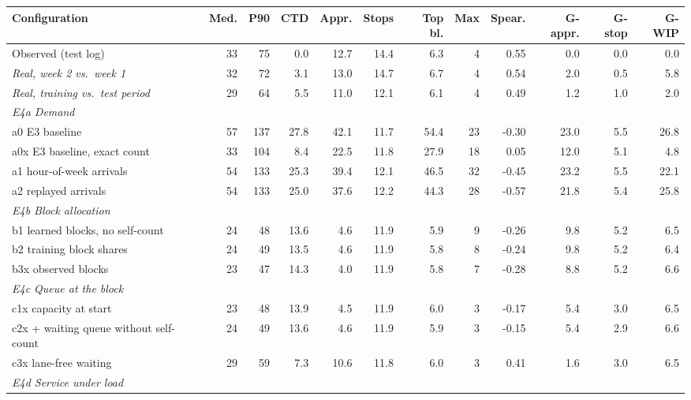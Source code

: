 \begin{table}[htbp]
\centering
\scriptsize
\setlength{\tabcolsep}{2.4pt}
\begin{tabular}{lrrrrrrrrrrr}
\toprule
\textbf{Configuration} & \textbf{Med.} & \textbf{P90} & \textbf{CTD} & \textbf{Appr.} & \textbf{Stops} & \textbf{Top bl.} & \textbf{Max} & \textbf{Spear.} & \textbf{G-appr.} & \textbf{G-stop} & \textbf{G-WIP} \\
\midrule
Observed (test log) & 33 & 75 & 0.0 & 12.7 & 14.4 & 6.3 & 4 & 0.55 & 0.0 & 0.0 & 0.0 \\
\textit{Real, week 2 vs.\ week 1} & 32 & 72 & 3.1 & 13.0 & 14.7 & 6.7 & 4 & 0.54 & 2.0 & 0.5 & 5.8 \\
\textit{Real, training vs.\ test period} & 29 & 64 & 5.5 & 11.0 & 12.1 & 6.1 & 4 & 0.49 & 1.2 & 1.0 & 2.0 \\
\midrule
\multicolumn{12}{l}{\textit{E4a Demand}} \\
a0 E3 baseline & 57 & 137 & 27.8 & 42.1 & 11.7 & 54.4 & 23 & -0.30 & 23.0 & 5.5 & 26.8 \\
a0x E3 baseline, exact count & 33 & 104 & 8.4 & 22.5 & 11.8 & 27.9 & 18 & 0.05 & 12.0 & 5.1 & 4.8 \\
a1 hour-of-week arrivals & 54 & 133 & 25.3 & 39.4 & 12.1 & 46.5 & 32 & -0.45 & 23.2 & 5.5 & 22.1 \\
a2 replayed arrivals & 54 & 133 & 25.0 & 37.6 & 12.2 & 44.3 & 28 & -0.57 & 21.8 & 5.4 & 25.8 \\
\midrule
\multicolumn{12}{l}{\textit{E4b Block allocation}} \\
b1 learned blocks, no self-count & 24 & 48 & 13.6 & 4.6 & 11.9 & 5.9 & 9 & -0.26 & 9.8 & 5.2 & 6.5 \\
b2 training block shares & 24 & 49 & 13.5 & 4.6 & 11.9 & 5.8 & 8 & -0.24 & 9.8 & 5.2 & 6.4 \\
b3x observed blocks & 23 & 47 & 14.3 & 4.0 & 11.9 & 5.8 & 7 & -0.28 & 8.8 & 5.2 & 6.6 \\
\midrule
\multicolumn{12}{l}{\textit{E4c Queue at the block}} \\
c1x capacity at start & 23 & 48 & 13.9 & 4.5 & 11.9 & 6.0 & 3 & -0.17 & 5.4 & 3.0 & 6.5 \\
c2x + waiting queue without self-count & 24 & 49 & 13.6 & 4.6 & 11.9 & 5.9 & 3 & -0.15 & 5.4 & 2.9 & 6.6 \\
c3x lane-free waiting & 29 & 59 & 7.3 & 10.6 & 11.8 & 6.0 & 3 & 0.41 & 1.6 & 3.0 & 6.5 \\
\midrule
\multicolumn{12}{l}{\textit{E4d Service under load}} \\

\end{tabular}
\end{table}
